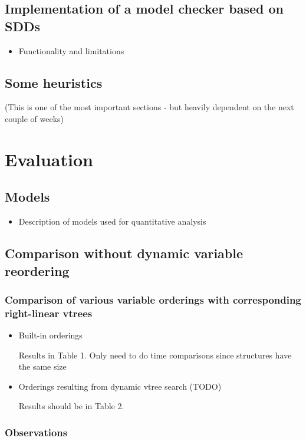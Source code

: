 \documentclass[12]{article}
\begin{document}
\subsection{Implementation of a model checker based on SDDs}

\begin{itemize}
\item Functionality and limitations
\end{itemize}


\subsection{Some heuristics}
(This is one of the most important sections - but heavily dependent on the next couple of weeks)



\section{Evaluation} 

\subsection{Models}
\begin{itemize}
\item Description of models used for quantitative analysis 

\end{itemize}
\subsection{Comparison without dynamic variable reordering}
\subsubsection{Comparison of various variable orderings with corresponding right-linear vtrees}
\begin{itemize}
\item Built-in orderings

Results in Table 1. Only need to do time comparisons since structures have the same size

\item Orderings resulting from dynamic vtree search
(TODO) 

Results should be in Table 2.

\end{itemize}

\subsubsection{Observations}
\end{document}
